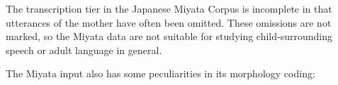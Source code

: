 \documentclass[a4paper, 11pt]{book}
\newcommand{\und}{\underline{{ }}\hspace{0.2mm}}	%
\begin{document}

The transcription tier in the Japanese Miyata Corpus is incomplete in that utterances of the mother have often been omitted. These omissions are not marked, so the Miyata data are not suitable for studying child-surrounding speech or adult language in general. 

The Miyata input also has some peculiarities in its morphology coding: 
\end{document}

